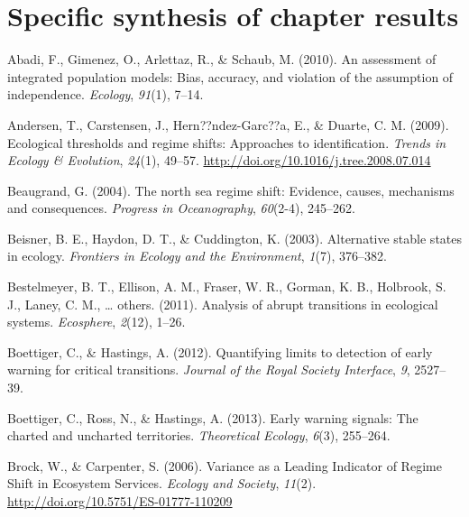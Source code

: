 \documentclass[12pt,twoside,openany]{reedthesis}
\begin{document}
\hypertarget{specific-synthesis-of-chapter-results}{%
\section{Specific synthesis of chapter results}\label{specific-synthesis-of-chapter-results}}

\hypertarget{refs}{}
\leavevmode\hypertarget{ref-abadi2010assessment}{}%
Abadi, F., Gimenez, O., Arlettaz, R., \& Schaub, M. (2010). An assessment of integrated population models: Bias, accuracy, and violation of the assumption of independence. \emph{Ecology}, \emph{91}(1), 7--14.

\leavevmode\hypertarget{ref-andersen_ecological_2009}{}%
Andersen, T., Carstensen, J., Hern??ndez-Garc??a, E., \& Duarte, C. M. (2009). Ecological thresholds and regime shifts: Approaches to identification. \emph{Trends in Ecology \& Evolution}, \emph{24}(1), 49--57. \url{http://doi.org/10.1016/j.tree.2008.07.014}

\leavevmode\hypertarget{ref-beaugrand2004north}{}%
Beaugrand, G. (2004). The north sea regime shift: Evidence, causes, mechanisms and consequences. \emph{Progress in Oceanography}, \emph{60}(2-4), 245--262.

\leavevmode\hypertarget{ref-beisner2003alternative}{}%
Beisner, B. E., Haydon, D. T., \& Cuddington, K. (2003). Alternative stable states in ecology. \emph{Frontiers in Ecology and the Environment}, \emph{1}(7), 376--382.

\leavevmode\hypertarget{ref-bestelmeyer_analysis_2011}{}%
Bestelmeyer, B. T., Ellison, A. M., Fraser, W. R., Gorman, K. B., Holbrook, S. J., Laney, C. M., \ldots{} others. (2011). Analysis of abrupt transitions in ecological systems. \emph{Ecosphere}, \emph{2}(12), 1--26.

\leavevmode\hypertarget{ref-boettiger_quantifying_2012}{}%
Boettiger, C., \& Hastings, A. (2012). Quantifying limits to detection of early warning for critical transitions. \emph{Journal of the Royal Society Interface}, \emph{9}, 2527--39.

\leavevmode\hypertarget{ref-boettiger_early_2013}{}%
Boettiger, C., Ross, N., \& Hastings, A. (2013). Early warning signals: The charted and uncharted territories. \emph{Theoretical Ecology}, \emph{6}(3), 255--264.

\leavevmode\hypertarget{ref-brock_variance_2006}{}%
Brock, W., \& Carpenter, S. (2006). Variance as a Leading Indicator of Regime Shift in Ecosystem Services. \emph{Ecology and Society}, \emph{11}(2). \url{http://doi.org/10.5751/ES-01777-110209}
\end{document}
